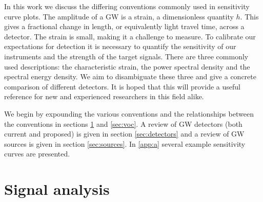 In this work we discuss the differing conventions commonly used in sensitivity curve plots. The amplitude of a GW is a strain, a dimensionless quantity $h$. This gives a fractional change in length, or equivalently light travel time, across a detector. The strain is small, making it a challenge to measure. To calibrate our expectations for detection it is necessary to quantify the sensitivity of our instruments and the strength of the target signals. There are three commonly used descriptions: the characteristic strain, the power spectral density and the spectral energy density. We aim to disambiguate these three and give a concrete comparison of different detectors. It is hoped that this will provide a useful reference for new and experienced researchers in this field alike. 

We begin by expounding the various conventions and the relationships between the conventions in sections \ref{sec:conventions} and \ref{sec:voc}. A review of GW detectors (both current and proposed) is given in section \ref{sec:detectors} and a review of GW sources is given in section \ref{sec:sources}. In \ref{app:a} several example sensitivity curves are presented. 


\section{Signal analysis}\label{sec:conventions}

